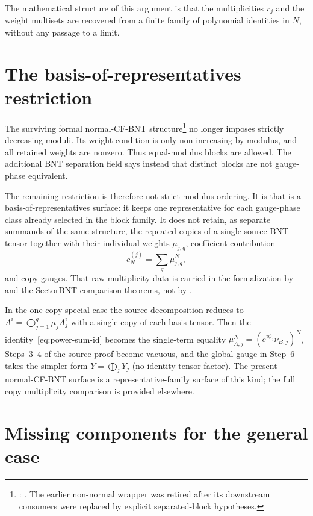 \documentclass{article}
\begin{document}
The mathematical structure of this argument is that the multiplicities $r_j$
and the weight multisets are recovered from a finite family of polynomial
identities in $N$, without any passage to a limit.

\section{The basis-of-representatives restriction}

The surviving formal normal-CF-BNT structure\footnote{%
    : .
    The earlier non-normal wrapper was retired after its downstream consumers
    were replaced by explicit separated-block hypotheses.} no longer imposes
strictly decreasing moduli. Its weight condition is only non-increasing by
modulus, and all retained weights are nonzero. Thus equal-modulus blocks are
allowed. The additional BNT separation field says instead that distinct blocks
are not gauge-phase equivalent.

The remaining restriction is therefore not strict modulus ordering. It is that
 is a basis-of-representatives surface: it
keeps one representative for each gauge-phase class already selected in the
block family. It does not retain, as separate summands of the same structure,
the repeated copies of a single source BNT tensor together with their individual
weights $\mu_{j,q}$, coefficient contribution
\[
    c_N^{(j)}=\sum_q \mu_{j,q}^N,
\]
and copy gauges. That raw multiplicity data is carried in the formalization by
 and the SectorBNT comparison theorems, not by
.

In the one-copy special case the source decomposition reduces to
$A^i = \bigoplus_{j=1}^{g} \mu_j A_j^i$ with a single copy of each basis tensor.
Then the identity~\eqref{eq:power-sum-id} becomes the single-term equality
$\mu_{A,j}^N = (e^{i\phi_j}\nu_{B,j})^N$, Steps~3--4 of the source proof become
vacuous, and the global gauge in Step~6 takes the simpler form
$Y = \bigoplus_j Y_j$ (no identity tensor factor). The present normal-CF-BNT
surface is a representative-family surface of this kind; the full copy
multiplicity comparison is provided elsewhere.

\section{Missing components for the general case}
\end{document}
